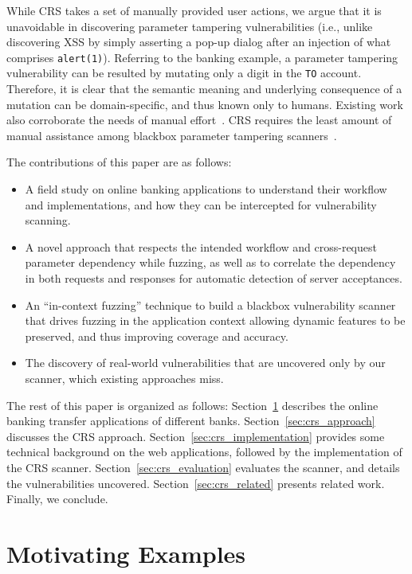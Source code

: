 \documentclass[letter]{sig-alternate-2013}
\begin{document}
While CRS takes a set of manually provided user actions, we argue that it is unavoidable in discovering parameter tampering vulnerabilities (i.e., unlike discovering XSS by simply asserting a pop-up dialog after an injection of what comprises \verb"alert(1)"). Referring to the banking example, a parameter tampering vulnerability can be resulted by mutating only a digit in the \verb"TO" account. Therefore, it is clear that the semantic meaning and underlying consequence of a mutation can be domain-specific, and thus known only to humans. Existing work also corroborate the needs of manual effort~\cite{whyjohnny,shop-for-free}. CRS requires the least amount of manual assistance among blackbox parameter tampering scanners~\cite{notamper,acunetix,webscarab,tamperdata}.

The contributions of this paper are as follows:

\begin{itemize}

\item A field study on online banking applications to understand their workflow and implementations, and how they can be intercepted for vulnerability scanning.
\item A novel approach that respects the intended workflow and cross-request parameter dependency while fuzzing, as well as to correlate the dependency in both requests and responses for automatic detection of server acceptances.
\item An ``in-context fuzzing'' technique to build a blackbox vulnerability scanner that drives fuzzing in the application context allowing dynamic features to be preserved, and thus improving coverage and accuracy.
\item The discovery of real-world vulnerabilities that are uncovered only by our scanner, which existing approaches miss.
\end{itemize}

The rest of this paper is organized as follows: Section~\ref{sec:crs_examples} describes the online banking transfer applications of different banks. Section~\ref{sec:crs_approach} discusses the CRS approach. Section~\ref{sec:crs_implementation} provides some technical background on the web applications, followed by the implementation of the CRS scanner. Section~\ref{sec:crs_evaluation} evaluates the scanner, and details the vulnerabilities uncovered. Section~\ref{sec:crs_related} presents related work. Finally, we conclude. \section{Motivating Examples}
\label{sec:crs_examples}
\end{document}
